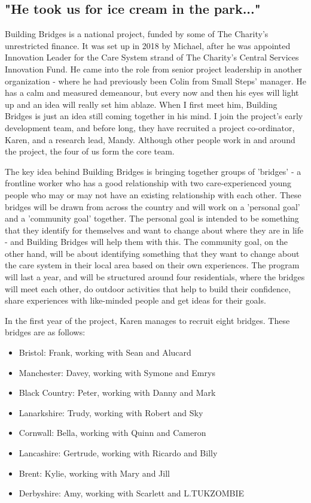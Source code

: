 \subsection{"He took us for ice cream in the park..."}
\label{sec:4-building}
Building Bridges is a national project, funded by some of The Charity's unrestricted finance. It was set up in 2018 by Michael, after he was appointed Innovation Leader for the Care System strand of The Charity's Central Services Innovation Fund. He came into the role from senior project leadership in another organization - where he had previously been Colin from Small Steps' manager. He has a calm and measured demeanour, but every now and then his eyes will light up and an idea will really set him ablaze. When I first meet him, Building Bridges is just an idea still coming together in his mind. I join the project's early development team, and before long, they have recruited a project co-ordinator, Karen, and a research lead, Mandy. Although other people work in and around the project, the four of us form the core team. 

The key idea behind Building Bridges is bringing together groups of 'bridges' - a frontline worker who has a good relationship with two care-experienced young people who may or may not have an existing relationship with each other. These bridges will be drawn from across the country and will work on a 'personal goal' and  a 'community goal' together. The personal goal is intended to be something that they identify for themselves and want to change about where they are in life - and Building Bridges will help them with this. The community goal, on the other hand, will be about identifying something that they want to change about the care system in their local area based on their own experiences. The program will last a year, and will be structured around four residentials, where the bridges will meet each other, do outdoor activities that help to build their confidence, share experiences with like-minded people and get ideas for their goals. 

In the first year of the project, Karen manages to recruit eight bridges. These bridges are as follows:
\begin{itemize} 
\item Bristol: Frank, working with Sean and Alucard
\item Manchester: Davey, working with Symone and Emrys
\item Black Country: Peter, working with Danny and Mark
\item Lanarkshire: Trudy, working with Robert and Sky
\item Cornwall: Bella, working with Quinn and Cameron
\item Lancashire: Gertrude, working with Ricardo and Billy
\item Brent: Kylie, working with Mary and Jill
\item Derbyshire: Amy, working with Scarlett and L.TUKZOMBIE
\end{itemize}

